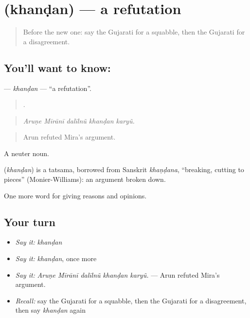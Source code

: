 \section[\texorpdfstring{\gu{ખંડન} (khanḍan)}{ખંડન (khanḍan)}]{ (khanḍan) — a refutation}

\label{lesson:GU-C342-khandan}



\begin{quote}
Before the new one: say the Gujarati for a squabble, then the Gujarati for a disagreement.
\end{quote}

\subsection*{You'll want to know: }
\textbf{} — \emph{khanḍan} — \textquotedblleft{}a refutation\textquotedblright{}.

\begin{quote}
    .
\end{quote}

\begin{quote}
\emph{Aruṇe Mīrānī dalīlnũ khanḍan karyũ.}
\end{quote}

\begin{quote}
Arun refuted Mira's argument.
\end{quote}

A neuter noun.

\begin{cousinweb}
\textbf{} (\emph{khanḍan}) is a tatsama, borrowed from Sanskrit \emph{khaṇḍana}, \textquotedblleft{}breaking, cutting to pieces\textquotedblright{} (Monier-Williams): an argument broken down.
\end{cousinweb}

\begin{grammarlens}[title={What you've built}]
One more word for giving reasons and opinions.
\end{grammarlens}

\subsection*{Your turn}
\begin{itemize}
\raggedright
  \item \emph{Say it:} \emph{khanḍan}
  \item \emph{Say it:} \emph{khanḍan}, once more
  \item \emph{Say it:} \emph{Aruṇe Mīrānī dalīlnũ khanḍan karyũ.} — Arun refuted Mira's argument.
  \item \emph{Recall:} say the Gujarati for a squabble, then the Gujarati for a disagreement, then say \emph{khanḍan} again
\end{itemize}

